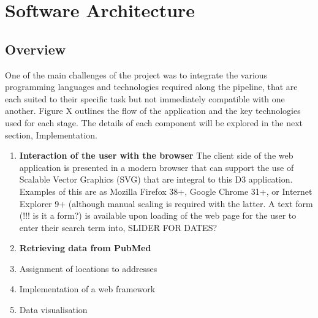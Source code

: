 \documentclass{report}
\begin{document}
\chapter{Software Architecture}
\section{Overview}
One of the main challenges of the project was to integrate the various programming languages and technologies required along the pipeline, that are each suited to their specific task but not immediately compatible with one another. Figure X outlines the flow of the application and the key technologies used for each stage. The details of each component will be explored in the next section, Implementation.

\begin{enumerate}
\item{\textbf{Interaction of the user with the browser}} 
\newline The client side of the web application is presented in a modern browser that can support the use of Scalable Vector Graphics (SVG) that are integral to this D3 application. Examples of this are as Mozilla Firefox 38+, Google Chrome 31+, or Internet Explorer 9+ (although manual scaling is required with the latter\cite{caniuse}. A text form (!!! is it a form?) is available upon loading of the web page for the user to enter their search term into, SLIDER FOR DATES?
\item{\textbf{Retrieving data from PubMed}}
\item{Assignment of locations to addresses}
\item{Implementation of a web framework}
\item{Data visualisation} 
\end{enumerate}
\end{document}
